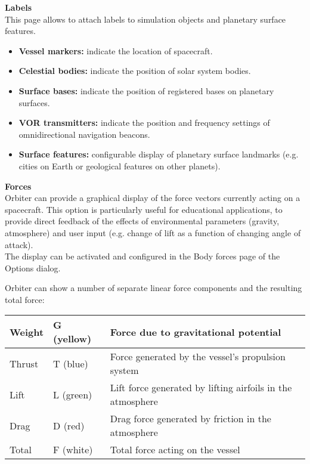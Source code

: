\documentclass[Orbiter User Manual.tex]{subfiles}
\begin{document}
\noindent
\textbf{Labels}\\
This page allows to attach labels to simulation objects and planetary surface features.

\begin{figure}[H]
	\centering
\end{figure}

\begin{itemize}
\item \textbf{Vessel markers:} indicate the location of spacecraft.
\item \textbf{Celestial bodies:} indicate the position of solar system bodies.
\item \textbf{Surface bases:} indicate the position of registered bases on planetary surfaces.
\item \textbf{VOR transmitters:} indicate the position and frequency settings of omnidirectional navigation beacons.
\item \textbf{Surface features:} configurable display of planetary surface landmarks (e.g. cities on Earth or geological features on other planets).
\end{itemize}

\noindent
\textbf{Forces}\\
Orbiter can provide a graphical display of the force vectors currently acting on a spacecraft. This option is particularly useful for educational applications, to provide direct feedback of the effects of environmental parameters (gravity, atmosphere) and user input (e.g. change of lift as a function of changing angle of attack).\\
The display can be activated and configured in the Body forces page of the Options dialog.\\

\begin{figure}[H]
	\centering
\end{figure}

\noindent
Orbiter can show a number of separate linear force components and the resulting total force:

	\begin{longtable}{ |p{}|p{}|p{}| }
	\hline\rule{0pt}{2ex}
	Weight & G (yellow) & Force due to gravitational potential\\
	\hline\rule{0pt}{2ex}
	Thrust & T (blue) & Force generated by the vessel's propulsion system\\
	\hline\rule{0pt}{2ex}
	Lift & L (green) & Lift force generated by lifting airfoils in the atmosphere\\
	\hline\rule{0pt}{2ex}
	Drag & D (red) & Drag force generated by friction in the atmosphere\\
	\hline\rule{0pt}{2ex}
	Total & F (white) & Total force acting on the vessel\\
	\hline
	\end{longtable}
\end{document}
